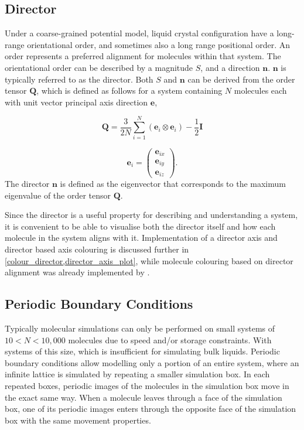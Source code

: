 \subsection{Director}
\label{director_explain}
Under a coarse-grained potential model, liquid crystal configuration have a long-range orientational order, and sometimes also a long range positional order. An order represents a preferred alignment for molecules within that system\cite{dong1997orientational}. The orientational order can be described by a magnitude $S$, and a direction $\mathbf{n}$. $\mathbf{n}$ is typically referred to as the director. Both $S$ and $\mathbf{n}$ can be derived from the order tensor $\mathbf{Q}$, which is defined as follows for a system containing $N$ molecules each with unit vector principal axis direction $\mathbf{e}$,

\begin{equation}
\mathbf{Q}=
\frac{3}{2N}
\sum_{i=1}^{N}
(\mathbf{e}_i
\otimes
\mathbf{e}_i)
-\frac{1}{2}\mathbf{I}
\end{equation}

\begin{equation}
\mathbf{e}_i=\begin{pmatrix}
  \mathbf{e}_{ix}\\
  \mathbf{e}_{iy}\\
  \mathbf{e}_{iz}
\end{pmatrix}.
\label{order_tensor_e}
\end{equation}
The director $\mathbf{n}$ is defined as the eigenvector that corresponds to the maximum eigenvalue of the order tensor $\mathbf{Q}$.

Since the director is a useful property for describing and understanding a system, it is convenient to be able to visualise both the director itself and how each molecule in the system aligns with it. Implementation of a director axis and director based axis colouring is discussed further in \cref{colour_director,director_axis_plot}, while molecule colouring based on director alignment was already implemented by \textcite{Battistini_2021}.

\subsection{Periodic Boundary Conditions}
\label{pbc_explain}
Typically molecular simulations can only be performed on small systems of $10<N<10,000$ molecules due to speed and/or storage constraints. With systems of this size, which is insufficient for simulating bulk liquids. Periodic boundary conditions allow modelling only a portion of an entire system\cite{gabriel2008molecular}, where an infinite lattice is simulated by repeating a smaller simulation box\cite{wu2014applying}. In each repeated boxes, periodic images of the molecules in the simulation box move in the exact same way. When a molecule leaves through a face of the simulation box, one of its periodic images enters through the opposite face of the simulation box with the same movement properties.

